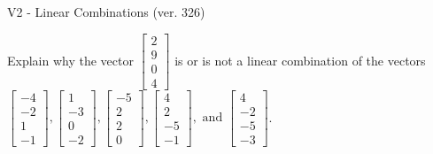 \begin{exercise}
  \begin{exerciseTitle}V2 - Linear Combinations (ver. 326)\end{exerciseTitle}
  \begin{exerciseStatement}
    Explain why the vector \(\left[\begin{array}{c}
2 \\
9 \\
0 \\
4
\end{array}\right]\)  is or is not a linear 
	combination of the vectors \(\left[\begin{array}{c}
-4 \\
-2 \\
1 \\
-1
\end{array}\right] , \left[\begin{array}{c}
1 \\
-3 \\
0 \\
-2
\end{array}\right] , \left[\begin{array}{c}
-5 \\
2 \\
2 \\
0
\end{array}\right] , \left[\begin{array}{c}
4 \\
2 \\
-5 \\
-1
\end{array}\right] , \text{ and } \left[\begin{array}{c}
4 \\
-2 \\
-5 \\
-3
\end{array}\right]\).
	



\end{exerciseStatement}
\end{exercise}
